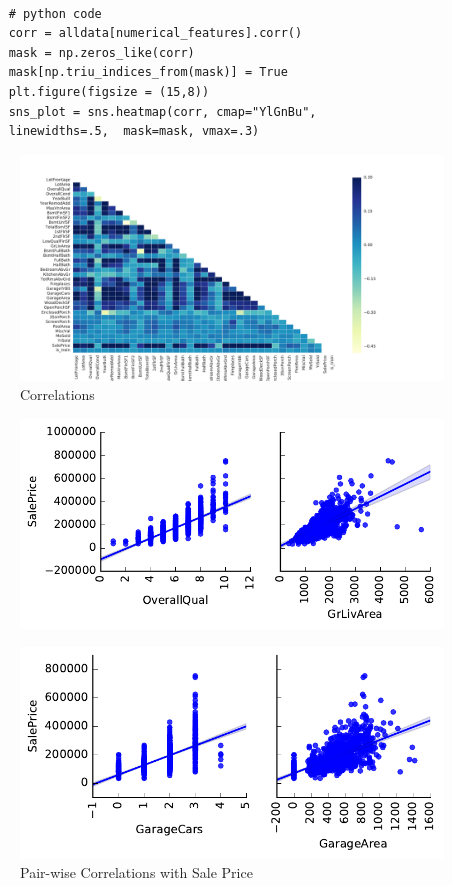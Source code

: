 \documentclass[sigconf]{acmart}
\begin{document}
	\begin{verbatim}
	
	# python code 
	corr = alldata[numerical_features].corr()	
	mask = np.zeros_like(corr)
	mask[np.triu_indices_from(mask)] = True	
	plt.figure(figsize = (15,8))	
	sns_plot = sns.heatmap(corr, cmap="YlGnBu", 
	linewidths=.5,  mask=mask, vmax=.3)	
	\end{verbatim}
	
	\begin{figure}[H]
		\centering
		\includegraphics[width=1.2\columnwidth]{images/correlations}	
		\caption{Correlations} \label{fig:correlations} 
	\end{figure}
	
	\begin{figure}[H]
		\centering
		\includegraphics[width=0.9\columnwidth]{images/pair_wise_correlations_1}	
	\end{figure}
	
	\begin{figure}[H]
		\centering
		\includegraphics[width=0.9\columnwidth]{images/pair_wise_correlations_2}	
		\caption{Pair-wise Correlations with Sale Price} \label{fig:pair_wise_correlations_2} 
	\end{figure}
	
\end{document}
